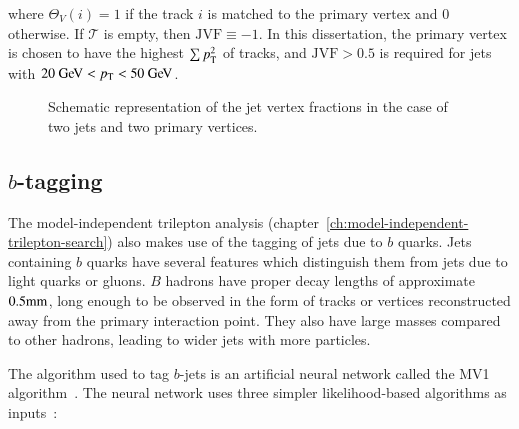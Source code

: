 where $\Theta_V(i)=1$ if the track $i$ is matched to the primary vertex and $0$ otherwise. If $\mathcal{T}$ is empty, then $\mathrm{JVF}\equiv -1$. In this dissertation, the primary vertex is chosen to have the highest $\sum p_{\text{T}}^2$ of tracks, and $\mathrm{JVF}>0.5$ is required for jets with $20 \GeV<\pt<50 \GeV$. 

\begin{figure}[htbp]
	\centering
	\caption{Schematic representation of the jet vertex fractions in the case of two jets and two primary vertices.}
	\label{fig:jvf-cartoon}
\end{figure}


\subsection{$b$-tagging}\label{sec:reco-bjets}
The model-independent trilepton analysis (chapter~\ref{ch:model-independent-trilepton-search}) also makes use of the tagging of jets due to $b$ quarks. Jets containing $b$ quarks have several features which distinguish them from jets due to light quarks or gluons. $B$ hadrons have proper decay lengths of approximate $0.5 \mathrm{mm}$, long enough to be observed in the form of tracks or vertices reconstructed away from the primary interaction point. They also have large masses compared to other hadrons, leading to wider jets with more particles. 

The algorithm used to tag $b$-jets is an artificial neural network called the MV1 algorithm~\cite{TheATLASCollaboration:2014vj}. The neural network uses three simpler likelihood-based algorithms as inputs~\cite{TheATLASCollaboration:2009ut,TheATLASCollaboration:2011wh}: 

